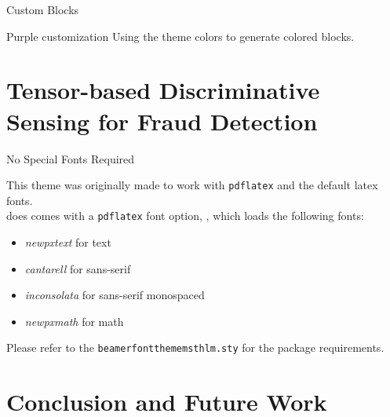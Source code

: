 \documentclass[newPxFont, numfooter, sectionpages]{beamer}
\begin{document}

\begin{frame}{Custom Blocks}
\begingroup
{}
\begin{block}{Purple customization}
	Using the theme colors to generate colored blocks.
\end{block}
\endgroup

\end{frame}

%
%
\section{Tensor-based Discriminative Sensing for Fraud Detection}


\begin{frame}[c]{No Special Fonts Required}

This theme was originally made to work with \texttt{pdflatex} and the default latex fonts.\\
\vspace{1em}
 does comes with a \texttt{pdflatex} font option, , which loads the following fonts:

\begin{itemize}
	\item \emph{newpxtext} for text
	\item \emph{cantarell} for sans-serif
	\item \emph{inconsolata} for sans-serif monospaced
	\item \emph{newpxmath} for math
\end{itemize}

Please refer to the \texttt{beamerfontthememsthlm.sty} for the package requirements.

\end{frame}


%
%
\section{Conclusion and Future Work}
\end{document}
